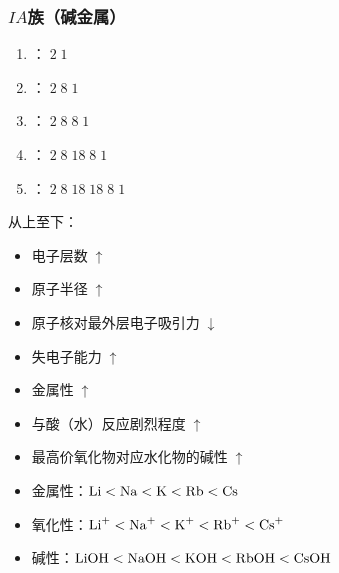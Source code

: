 \documentclass[a4paper]{article}
\begin{document}
	\subsubsection{$IA$族（碱金属）}
	\begin{minipage}{0.48\linewidth}
		\begin{enumerate}
			\item {}：$\;2\;1$
			\item {}：$\;2\;8\;1$
			\item {}：$\;2\;8\;8\;1$
			\item {}：$\;2\;8\;18\;8\;1$
			\item {}：$\;2\;8\;18\;18\;8\;1$
		\end{enumerate}
	\end{minipage}
	\hfill
	\begin{minipage}{.48\linewidth}
		从上至下：
		\begin{itemize}
			\item 电子层数$\;\uparrow$
			\item 原子半径$\;\uparrow$
			\item 原子核对最外层电子吸引力$\;\downarrow$
			\item 失电子能力$\;\uparrow$
			\item 金属性$\;\uparrow$
			\item 与酸（水）反应剧烈程度$\;\uparrow$
			\item 最高价氧化物对应水化物的碱性$\;\uparrow$
		\end{itemize}
	\end{minipage}
	\begin{itemize}
		\item 金属性：$\ce{Li}<\ce{Na}<\ce{K}<\ce{Rb}<\ce{Cs}$
		\item 氧化性：$\ce{Li+}<\ce{Na+}<\ce{K+}<\ce{Rb+}<\ce{Cs+}$
		\item 碱性：$\ce{LiOH}<\ce{NaOH}<\ce{KOH}<\ce{RbOH}<\ce{CsOH}$
	\end{itemize}
	
\end{document}
